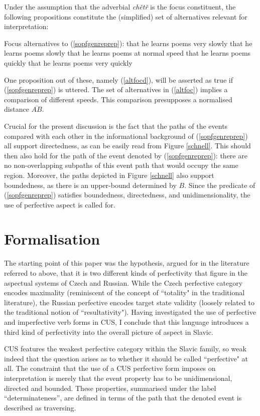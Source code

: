 \documentclass[output=paper,colorlinks,citecolor=brown]{langscibook}
\begin{document}
\largerpage

Under the assumption that the adverbial \textit{chětř} is the focus constituent, the following propositions constitute the (simplified) set of alternatives relevant for interpretation:

\ea \label{altfoc} Focus alternatives to (\ref{sopfgenreprep}):
\ea that he learns poems very slowly
\ex that he learns poems slowly
\ex that he learns poems at normal speed
\ex that he learns poems quickly\label{altfocd}
\ex that he learns poems very quickly
\z
\z

\noindent One proposition out of these, namely (\ref{altfocd}), will be asserted as true if (\ref{sopfgenreprep}) is uttered. The set of alternatives in (\ref{altfoc}) implies a comparison of different speeds. This comparison presupposes a normalised distance $\overline{AB}$.

Crucial for the present discussion is the fact that the paths of the events compared with each other in the informational background of (\ref{sopfgenreprep}) all support directedness, as can be easily read from Figure \ref{schnell}. This should then also hold for the path of the event denoted by (\ref{sopfgenreprep}): there are no non-overlapping subpaths of this event path that would occupy the same region. 
Moreover, the paths depicted in Figure \ref{schnell} also support boundedness, as there is an upper-bound determined by $B$.  
Since the predicate of (\ref{sopfgenreprep}) satisfies boundedness, directedness, and unidimensionality, the use of perfective aspect is called for. 




\section{Formalisation}\label{mueller:sec:formalism}
The starting point of this paper was the hypothesis, argued for in the literature referred to above, 
that it is two different kinds of perfectivity that figure in the aspectual systems of Czech and Russian. While the Czech perfective category encodes maximality (reminiscent of the concept of ``totality" in the traditional literature), the Russian perfective encodes target state validity (loosely related to the traditional notion of ``resultativity"). Having investigated the use of perfective and imperfective verb forms in CUS, I conclude that this language introduces a third kind of perfectivity into the overall picture of aspect in Slavic. 

CUS features the weakest perfective category within the Slavic family, so weak indeed that the question arises as to whether it should be called ``perfective" at all. The constraint that the use of a CUS perfective form imposes on interpretation is merely that  
the event property has to be unidimensional, directed and bounded. These properties, summarised under the label ``determinateness'', are defined in terms of the path that the denoted event is described as traversing.
\end{document}

